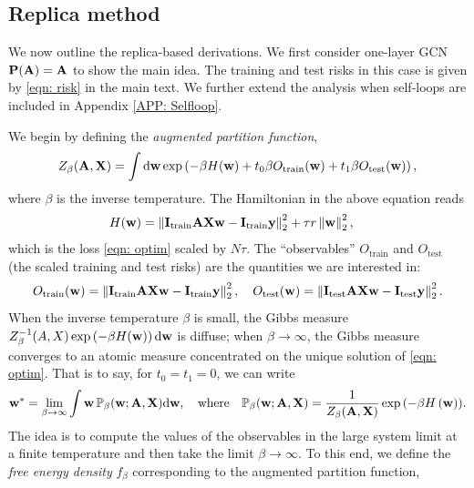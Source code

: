 \documentclass[9pt,twocolumn]{pnas-new}
\begin{document}
\subsection{Replica method}\label{SEC: replica}

We now outline the replica-based derivations. We first consider one-layer GCN $\mathbf{P}(\mathbf{A})=\mathbf{A}$ to show the main idea. The training and test risks in this case is given by \eqref{eqn: risk} in the main text. We further extend the analysis when self-loops are included in Appendix \ref{APP: Selfloop}.   

We begin by defining the \emph{augmented partition function},
\begin{equation*}
Z_\beta(\mathbf{A},\mathbf{X})=\int\mathrm{d}\mathbf{w}\exp\left(-\beta H(\mathbf{w}) +t_0\beta O_\text{train}(\mathbf{w}) +t_1 \beta O_\text{test}(\mathbf{w})\right),
\end{equation*}
where $\beta$ is the inverse temperature. The Hamiltonian in the above equation reads
\begin{equation}\label{eqn: Hami}
    \begin{aligned}
    H(\mathbf{w})&=\left\lVert\mathbf{I}_{\text{train}}\mathbf{A}\mathbf{X}\mathbf{w}-\mathbf{I}_{\text{train}}\mathbf{y}\right\rVert_2^2+\tau r\left\lVert\mathbf{w}\right\rVert^2_2,
    \end{aligned}
\end{equation}
which is the loss \eqref{eqn: optim} scaled by $N\tau$. The ``observables'' $O_\text{train}$ and $O_\text{test}$ (the scaled training and test risks) are the quantities we are interested in:
\begin{equation*}
    O_\text{train}(\mathbf{w})=\left\lVert\mathbf{I}_\text{train}\mathbf{A}\mathbf{X}\mathbf{w}-\mathbf{I}_\text{train}\mathbf{y}\right\rVert_2^2, \quad O_\text{test}(\mathbf{w})=\left\lVert\mathbf{I}_\text{test} \mathbf{A}\mathbf{X}\mathbf{w}-\mathbf{I}_\text{test}\mathbf{y}\right\rVert_2^2.
\end{equation*}
When the inverse temperature $\beta$ is small, the Gibbs measure $Z_\beta^{-1}(A,X) \exp\left(-\beta H(\mathbf{w}) \right) \mathrm{d}\mathbf{w}$  is diffuse; when $\beta \to \infty$, the Gibbs measure converges to an atomic measure concentrated on the unique solution of \eqref{eqn: optim}. That is to say, for $t_0=t_1=0$, we can write
\begin{equation*}
\mathbf{w}^*= \lim_{\beta \to \infty}\int \mathbf{w} \, \mathbb{P}_\beta(\mathbf{w};\mathbf{A},\mathbf{X})\mathrm{d} \mathbf{w}, \quad \text{where} \quad \mathbb{P}_\beta(\mathbf{w};\mathbf{A},\mathbf{X})=\frac{1}{Z_\beta(\mathbf{A},\mathbf{X})}\exp{\left(-\beta H\left(\ensuremath{\mathbf{w}}\right)\right)}.
\end{equation*}
The idea is to compute the values of the observables in the large system limit at a finite temperature and then take the limit $\beta \to \infty$. To this end, we define the \emph{free energy density} $f_\beta$ corresponding to the augmented partition function,
\end{document}
